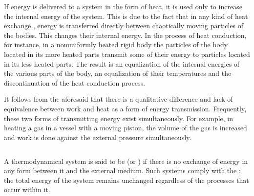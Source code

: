 If energy is delivered to a system in the form of heat, it is used only to increase the internal energy of the system. This is due to the fact that in any kind of heat exchange , energy is transferred directly between chaotically moving particles of the bodies. This changes their internal energy. In the process of heat conduction, for instance, in a nonuniformly heated rigid body the particles of the body located in its more heated parts transmit some of their energy to particles located in its less heated parts. The result is an equalization of the internal energies of the various parts of the body, an equalization of their temperatures and the discontinuation of the heat conduction process.

It follows from the aforesaid that there is a qualitative dif­ference and lack of equivalence between work and heat as a form of energy transmission. Frequently, these two forms of transmitting energy exist simultaneously. For example, in heating a gas in a vessel with a moving piston, the volume of the gas is increased and work is done against the external pres­sure simultaneously.

\subsection{}\label{9.2.7} A thermodynamical system is said to be  (or ) if there is no exchange of energy in any form between it and the external medium. Such systems comply with the : the total energy of the system remains unchanged regardless of the processes that occur within it. 

